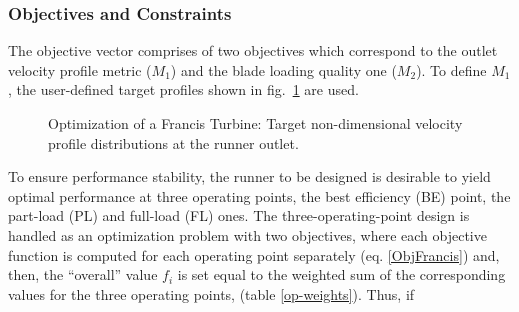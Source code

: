
\subsubsection{Objectives and Constraints}
The objective vector comprises of two objectives which correspond to the outlet velocity profile metric ($M_1$) and the blade loading quality one ($M_2$). To define $M_1$, the user-defined target profiles shown in fig.\ \ref{design-obj-tar} are used. 



\begin{figure}[h!]
\begin{minipage}[b]{1\linewidth}
 \centering
\end{minipage}
\caption{Optimization of a Francis Turbine: Target non-dimensional velocity profile distributions at the runner outlet.}
\label{design-obj-tar}
\end{figure}


To ensure performance stability, the runner to be designed is desirable to yield optimal performance at three operating points, the best efficiency (BE) point, the part-load (PL) and full-load (FL) ones. %
The three-operating-point design is handled as an optimization problem with two objectives, where each objective function is computed for each operating point separately (eq. \ref{ObjFrancis}) and, then, the “overall” value $f_i$ is set equal to the weighted sum of the corresponding values for the three operating points, (table \ref{op-weights}). Thus, if


